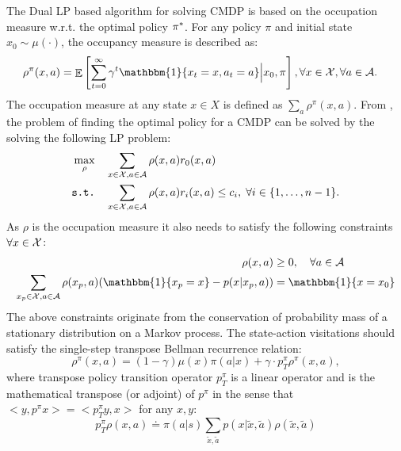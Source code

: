 The Dual LP based algorithm for solving CMDP is based on the occupation measure w.r.t. the optimal policy $\pi^{*}$. For any policy $\pi$ and initial state $x_0 \sim \mu(\cdot)$, the occupancy measure is described as:
\begin{align*}
    \rho^{\pi}(x,a) &= \E \left[ \sum_{t=0}^{\infty} \gamma^t \mathbbm{1}\{x_t=x, a_t=a\} \Big| x_0, \pi \right], \forall x \in \X, \forall a \in \A. 
\end{align*}
The occupation measure at any state $x \in X$ is defined as $\sum_{a} \rho^{\pi}(x,a)$.  From \citep[Chapter 9]{altman1999constrained}, the problem of finding the optimal policy for a CMDP can be solved by the solving the following LP problem: %
\begin{align*}
    \max_{\rho}  &\quad \sum_{x \in \mathcal{X}, a \in \mathcal{A}} \rho(x,a) r_0(x,a) \\  
    \texttt{s.t.}  &\quad \sum_{x \in \mathcal{X}, a \in \mathcal{A}} \rho(x,a) r_i(x,a) \leq c_i, \; \forall i \in \{1,\dots,n-1\}.
\end{align*}
 As $\rho$ is the occupation measure it also needs to satisfy the following constraints $\forall x \in \mathcal{X}$:
\begin{align*}
    \rho(x,a) &\geq 0,  \quad \forall a \in \A \\
    \sum_{x_p \in \X, a \in \A} \rho(x_p,a) (\mathbbm{1}\{ x_p = x\} - p(x|x_p,a))  &= \mathbbm{1}\{ x=x_0 \}
\end{align*}
The above constraints originate from the conservation of probability mass of a stationary distribution on a Markov process.  The state-action visitations should satisfy the single-step transpose Bellman recurrence relation:
\begin{equation*}
    \rho^{\pi}(x,a) = (1-\gamma) \mu(x) \pi(a|x) + \gamma \cdot p_{T}^{\pi} \rho^{\pi}(x,a), 
\end{equation*}
where transpose policy transition operator $p_{T}^{\pi}$ is a linear operator and is the mathematical transpose (or adjoint) of $p^{\pi}$ in the sense that $<y, p^{\pi}x> = <p_{T}^{\pi} y, x>$ for any $x, y$:
\begin{equation*}
    p_{T}^{\pi} \rho(x,a) \doteq \pi(a|s)\sum_{\tilde{x}, \tilde{a}} p(x|\tilde{x}, \tilde{a}) \rho(\tilde{x}, \tilde{a})
\end{equation*}

